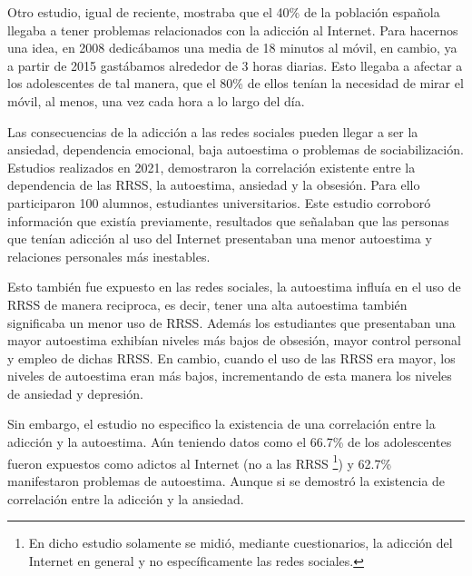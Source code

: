 \vspace{0.3cm}

Otro estudio, igual de reciente, mostraba que el 40\% de la población española llegaba a tener problemas relacionados con la adicción al Internet. Para hacernos una idea, en 2008 dedicábamos una media de 18 minutos al móvil, en cambio, ya a partir de 2015 gastábamos alrededor de 3 horas diarias. Esto llegaba a afectar a los adolescentes de tal manera, que el 80\% de ellos tenían la necesidad de mirar el móvil, al menos, una vez cada hora a lo largo del día. \cite{Adiccion-RRSS-Interesante}

\vspace{0.3cm}

Las consecuencias de la adicción a las redes sociales pueden llegar a ser la ansiedad, dependencia emocional, baja autoestima o problemas de sociabilización. Estudios realizados en 2021, demostraron la correlación existente entre la dependencia de las \acs{RRSS}, la autoestima, ansiedad y la obsesión. Para ello participaron 100 alumnos, estudiantes universitarios. Este estudio corroboró información que existía previamente, resultados que señalaban que las personas que tenían adicción al uso del Internet presentaban una menor autoestima y relaciones personales más inestables. \cite{CNEIP-RRSS-AS}

\vspace{0.3cm}

Esto también fue expuesto en las redes sociales, la autoestima influía en el uso de \acs{RRSS} de manera reciproca, es decir, tener una alta autoestima también significaba un menor uso de \acs{RRSS}. Además los estudiantes que presentaban una mayor autoestima exhibían niveles más bajos de obsesión, mayor control personal y empleo de dichas \acs{RRSS}. En cambio, cuando el uso de las \acs{RRSS} era mayor, los niveles de autoestima eran más bajos, incrementando de esta manera los niveles de ansiedad y depresión.

\vspace{0.3cm}

Sin embargo, el estudio no especifico la existencia de una correlación entre la adicción y la autoestima. Aún teniendo datos como el 66.7\% de los adolescentes fueron expuestos como adictos al Internet (no a las \acs{RRSS} \footnote{En dicho estudio solamente se midió, mediante cuestionarios, la adicción del Internet en general y no específicamente las redes sociales.}) y 62.7\% manifestaron problemas de autoestima. Aunque si se demostró la existencia de correlación entre la adicción y la ansiedad. \cite{CNEIP-RRSS-AS}

